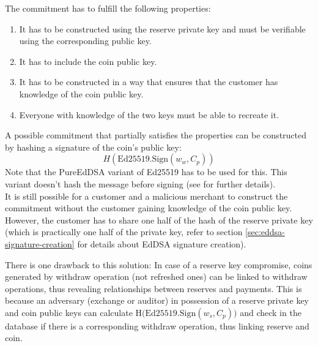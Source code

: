 The commitment has to fulfill the following properties:
\begin{enumerate}
    \item It has to be constructed using the reserve private key and must be verifiable using the corresponding public key.
    \item It has to include the coin public key.
    \item It has to be constructed in a way that ensures that the customer has knowledge of the coin public key.
    \item Everyone with knowledge of the two keys must be able to recreate it.
\end{enumerate}

A possible commitment that partially satisfies the properties can be constructed by hashing a signature of the coin's public key:
\begin{equation*}
    H( \text{Ed25519.Sign} (w_w, C_p) )
\end{equation*}
Note that the PureEdDSA variant of Ed25519 has to be used for this.
This variant doesn't hash the message before signing (see \cite{rfc8032} for further details).\\
It is still possible for a customer and a malicious merchant to construct the commitment without the customer gaining knowledge of the coin public key.
However, the customer has to share one half of the hash of the reserve private key (which is practically one half of the private key, refer to section \ref{sec:eddsa-signature-creation} for details about EdDSA signature creation).


There is one drawback to this solution:
In case of a reserve key compromise, coins generated by withdraw operation (not refreshed ones) can be linked to withdraw operations, thus revealing relationships between reserves and payments.
This is because an adversary (exchange or auditor) in possession of a reserve private key and coin public keys can calculate $ \text{H(Ed25519.Sign}(w_s, C_p)) $ and check in the database if there is a corresponding withdraw operation, thus linking reserve and coin.

